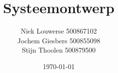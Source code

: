 \author{Niek Louwerse 500867102\\
		Jochem Giesbers 500855098\\
        Stijn Thoolen 500879500\\
		}
\title{Systeemontwerp}
\date{\today}




	
	
	
	
	
	
    
    
    
    
	\newpage
	
	
    
    \newpage
	\listoffigures
	\listoftables
